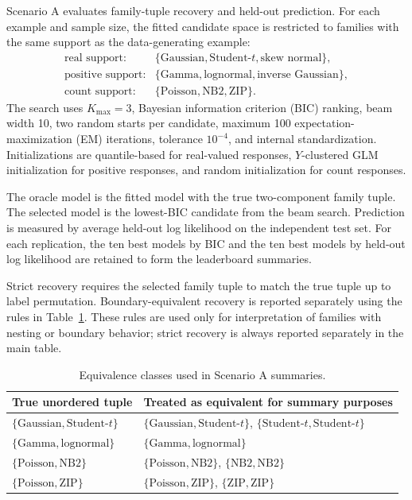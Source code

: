 \documentclass{article}
\begin{document}
Scenario A evaluates family-tuple recovery and held-out prediction.  For each
example and sample size, the fitted candidate space is restricted to families
with the same support as the data-generating example:
\[
\begin{array}{ll}
\text{real support:} & \{\text{Gaussian},\text{Student-}t,\text{skew normal}\},\\
\text{positive support:} & \{\text{Gamma},\text{lognormal},\text{inverse Gaussian}\},\\
\text{count support:} & \{\text{Poisson},\text{NB2},\text{ZIP}\}.
\end{array}
\]
The search uses \(K_{\max}=3\), Bayesian information criterion (BIC) ranking,
beam width 10, two random starts per candidate, maximum 100
expectation-maximization (EM) iterations, tolerance \(10^{-4}\), and internal
standardization.  Initializations are quantile-based for real-valued responses,
\(Y\)-clustered GLM initialization for positive responses, and random
initialization for count responses.

The oracle model is the fitted model with the true two-component family tuple.
The selected model is the lowest-BIC candidate from the beam search.  Prediction
is measured by average held-out log likelihood on the independent test set.
For each replication, the ten best models by BIC and the ten best models by
held-out log likelihood are retained to form the leaderboard summaries.

Strict recovery requires the selected family tuple to match the true tuple up to
label permutation.  Boundary-equivalent recovery is reported separately using
the rules in Table~\ref{tab:supp_equiv}.  These rules are used only for
interpretation of families with nesting or boundary behavior; strict recovery is
always reported separately in the main table.

\begin{table}[htbp]
\centering
\caption{Equivalence classes used in Scenario A summaries.}
\label{tab:supp_equiv}
\begin{tabular}{ll}
\toprule
True unordered tuple & Treated as equivalent for summary purposes \\
\midrule
\(\{\text{Gaussian},\text{Student-}t\}\) &
\(\{\text{Gaussian},\text{Student-}t\}\), \(\{\text{Student-}t,\text{Student-}t\}\) \\
\(\{\text{Gamma},\text{lognormal}\}\) &
\(\{\text{Gamma},\text{lognormal}\}\) \\
\(\{\text{Poisson},\text{NB2}\}\) &
\(\{\text{Poisson},\text{NB2}\}\), \(\{\text{NB2},\text{NB2}\}\) \\
\(\{\text{Poisson},\text{ZIP}\}\) &
\(\{\text{Poisson},\text{ZIP}\}\), \(\{\text{ZIP},\text{ZIP}\}\) \\
\bottomrule
\end{tabular}
\end{table}
\end{document}
